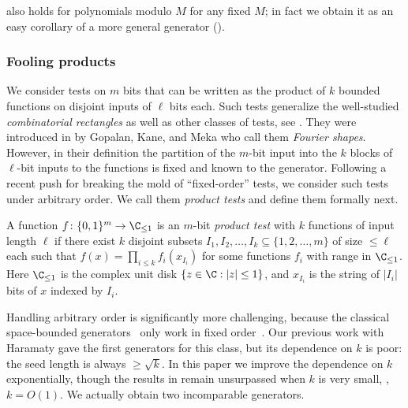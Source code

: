 \documentclass{toc}
\newcommand{\zo}{\{0,1\}}
\def\Blocklength{\ell}
\DeclarePairedDelimiter{\abs}{\lvert}{\rvert}
\begin{document}
 also holds for polynomials modulo $M$ for any fixed $M$; 
in fact we obtain it as an easy corollary of a more general generator
%
().  %

\subsubsection{Fooling products} %
%
%
We consider tests on $m$ bits that can be written as the product of $k$
bounded functions on disjoint inputs of $\Blocklength$ bits
each.  %
Such tests
generalize the well-studied \emph{combinatorial rectangles}
\cite{AjtaiKS87,Nisan92,NisanZ96,ImpagliazzoNW94,EvenGLNV98,ArmoniSWZ96,Lu02,Viola-rbd,GopalanMRTV12,GopalanY14}
as well as other classes of tests, see \cite{GopalanKM18}. They were
introduced %
in \cite{GopalanKM18}   %
by Gopalan, Kane, and Meka who call them
\emph{Fourier shapes}. However, in their definition the partition of the
$m$-bit input into the $k$ blocks of $\Blocklength$-bit inputs to the functions
is fixed and known
to the generator. Following a recent push for breaking the mold of
``fixed-order'' tests, we consider such tests under arbitrary order. We call
them \emph{product tests} and define them formally next.

%
%
\begin{definition} \label{def-prod}
A function $f\colon \zo^m \to \C_{\le 1}$ is %
an $m$-bit   %
\emph{product test} with $k$
functions of input length $\Blocklength$ if there exist $k$ disjoint subsets
$I_1, I_2,\ldots, I_k \subseteq \{1, 2, \ldots, m\}$
of size $\le \Blocklength$
each  %
such that $f(x) = \prod_{i \le k} f_i(x_{I_i})$
for some functions $f_i$ with range in $\C_{\le
1}$.  Here $\C_{\le 1}$ is the complex unit disk $\{ z \in \C: \abs{z} \le 1\}$,
and $x_{I_i}$ %
is the string of   %
$|I_i|$ bits of $x$ indexed by $I_i$.
\end{definition}

Handling arbitrary order is significantly more challenging, because
the classical space-bounded generators~\cite{Nisan92,ImpagliazzoNW94}
%
%
%
only work in fixed order~\cite{Tzur09,BogdanovPW11}.  Our previous 
work with Haramaty \cite{HaramatyLV-bipnfp}
gave the first generators for this class, but 
%
its dependence   %
on $k$ is poor: the seed
length is always $\ge \sqrt{k}$.  In this %
paper  %
we improve the %
dependence  %
on $k$ exponentially, though the results in \cite{HaramatyLV-bipnfp}
%
remain   %
unsurpassed when $k$ is very small, \eg, $k = O(1)$. We actually obtain
two incomparable generators.
\end{document}
